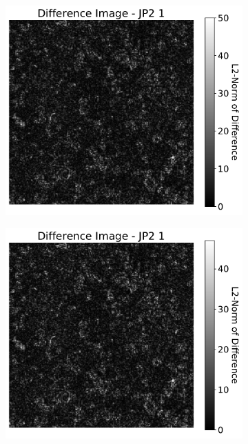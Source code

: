 \begin{figure}[htb]
\begin{subfigure}[b]{0.48\textwidth}
        \caption{}
        \label{fig:img_quality_comp_jp2_1_center_histo}
    \end{subfigure}
    \\
    \begin{subfigure}[b]{0.48\textwidth}
        \centering
        \includegraphics[width=\textwidth]{doc/thesis/0_figures/compare_quality/set1/jp2_1_center_diff_heatmap}
        \caption{}
        \label{fig:img_quality_comp_jp2_1_center_diff}
    \end{subfigure}
    \begin{subfigure}[b]{0.48\textwidth}
        \centering
        \includegraphics[width=\textwidth]{doc/thesis/0_figures/compare_quality/set1/jp2_1_center_diff_heatmap_rel}

\end{subfigure}
\end{figure}
